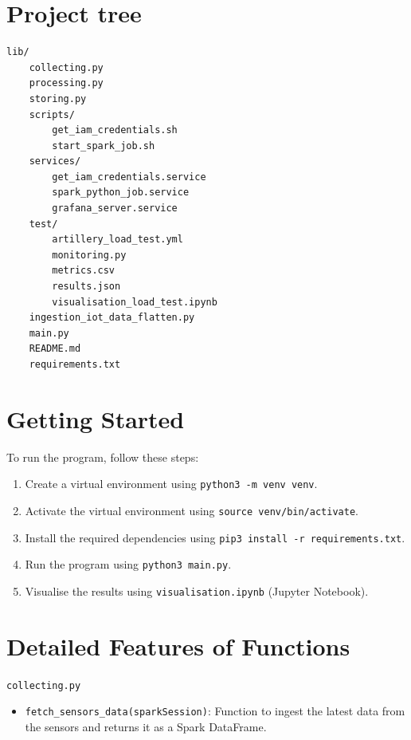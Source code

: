 \documentclass[12pt,oneside]{book} %
\begin{document}
\begin{subappendices}
    \section{Project tree}
    \begin{lstlisting}[breaklines=true, basicstyle=\small]
    lib/
    collecting.py
    processing.py
    storing.py
    scripts/
        get_iam_credentials.sh
        start_spark_job.sh
    services/
        get_iam_credentials.service
        spark_python_job.service
        grafana_server.service
    test/
        artillery_load_test.yml
        monitoring.py
        metrics.csv
        results.json
        visualisation_load_test.ipynb
    ingestion_iot_data_flatten.py
    main.py
    README.md
    requirements.txt
    \end{lstlisting}

    \section{Getting Started}
    To run the program, follow these steps:
    \begin{enumerate}
        \itemindent=17.87pt
        \item Create a virtual environment using \texttt{python3 -m venv venv}.
        \item Activate the virtual environment using \texttt{source venv/bin/activate}.
        \item Install the required dependencies using \texttt{pip3 install -r
                  requirements.txt}.
        \item Run the program using \texttt{python3 main.py}.
        \item Visualise the results using \texttt{visualisation.ipynb} (Jupyter Notebook).
    \end{enumerate}

    \section{Detailed Features of Functions}
    \begin{description}
        \item \texttt{collecting.py}
              \begin{itemize}
                  \item \texttt{fetch\_sensors\_data(sparkSession)}: Function to ingest the latest data from the sensors and returns it as a Spark DataFrame.
              \end{itemize}


\end{description}
\end{subappendices}
\end{document}
